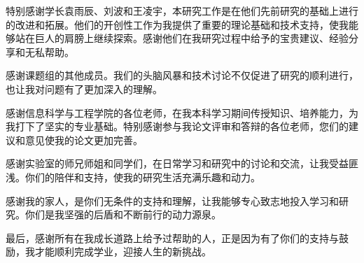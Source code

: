 \documentclass[AutoFakeBold]{LZUThesis}
\begin{document}
特别感谢学长袁雨辰、刘波和王凌宇，本研究工作是在他们先前研究的基础上进行的改进和拓展。他们的开创性工作为我提供了重要的理论基础和技术支持，使我能够站在巨人的肩膀上继续探索。感谢他们在我研究过程中给予的宝贵建议、经验分享和无私帮助。

感谢课题组的其他成员。我们的头脑风暴和技术讨论不仅促进了研究的顺利进行，也让我对问题有了更加深入的理解。

感谢信息科学与工程学院的各位老师，在我本科学习期间传授知识、培养能力，为我打下了坚实的专业基础。特别感谢参与我论文评审和答辩的各位老师，您们的建议和意见使我的论文更加完善。

感谢实验室的师兄师姐和同学们，在日常学习和研究中的讨论和交流，让我受益匪浅。你们的陪伴和支持，使我的研究生活充满乐趣和动力。

感谢我的家人，是你们无条件的支持和理解，让我能够专心致志地投入学习和研究。你们是我坚强的后盾和不断前行的动力源泉。

最后，感谢所有在我成长道路上给予过帮助的人，正是因为有了你们的支持与鼓励，我才能顺利完成学业，迎接人生的新挑战。

\Grade %
\end{document}
